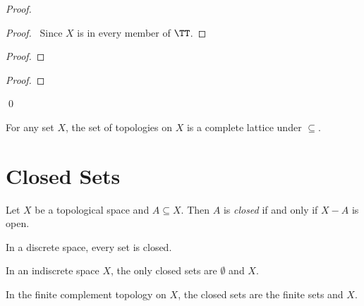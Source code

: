 \begin{proof}
    \pf
    \begin{proof}
        \pf\ Since $X$ is in every member of $\TT$.
    \end{proof}
    \begin{proof}
    \end{proof}
    \begin{proof}
    \end{proof}
    \qed
\end{proof}

\begin{corollary}
    For any set $X$, the set of topologies on $X$ is a complete lattice under $\subseteq$.
\end{corollary}

\section{Closed Sets}

\begin{definition}
    Let $X$ be a topological space and $A \subseteq X$. Then $A$ is \emph{closed} if and only if $X -
    A$ is open.
\end{definition}

\begin{proposition}
    In a discrete space, every set is closed.
\end{proposition}

\begin{proposition}
    In an indiscrete space $X$, the only closed sets are $\emptyset$ and $X$.
\end{proposition}

\begin{proposition}
    In the finite complement topology on $X$, the closed sets are the finite sets and $X$.
\end{proposition}

